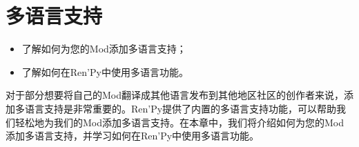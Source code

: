 \documentclass[../../Main.tex]{subfiles}
\begin{document}
\chapter{多语言支持}
\begin{ChapterGoals}
    \begin{itemize}
        \item 了解如何为您的Mod添加多语言支持；
        \item 了解如何在Ren'Py中使用多语言功能。
    \end{itemize}
\end{ChapterGoals}

对于部分想要将自己的Mod翻译成其他语言发布到其他地区社区的创作者来说，添加多语言支持是非常重要的。Ren'Py提供了内置的多语言支持功能，可以帮助我们轻松地为我们的Mod添加多语言支持。在本章中，我们将介绍如何为您的Mod添加多语言支持，并学习如何在Ren'Py中使用多语言功能。


\end{document}
